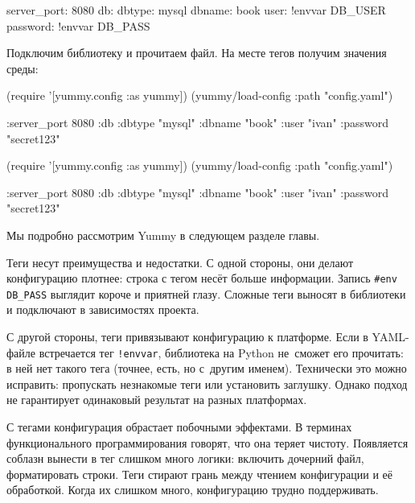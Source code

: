 \begin{english}
  \begin{yaml}
server_port: 8080
db:
  dbtype:   mysql
  dbname:   book
  user:     !envvar DB_USER
  password: !envvar DB_PASS
  \end{yaml}
\end{english}

Подключим библиотеку и прочитаем файл. На месте тегов получим значения среды:

\ifnarrow

\begin{english}
  \begin{clojure}
(require '[yummy.config :as yummy])
(yummy/load-config
  {:path "config.yaml"})

{:server_port 8080
 :db {:dbtype "mysql"
      :dbname "book"
      :user "ivan"
      :password "secret123"}}
  \end{clojure}
\end{english}

\else

\begin{english}
  \begin{clojure}
(require '[yummy.config :as yummy])
(yummy/load-config {:path "config.yaml"})

{:server_port 8080
 :db {:dbtype "mysql"
      :dbname "book"
      :user "ivan"
      :password "secret123"}}
  \end{clojure}
\end{english}
\fi


\noindent
Мы подробно рассмотрим Yummy в следующем разделе главы.

Теги несут преимущества и недостатки. С одной стороны, они делают конфигурацию
плотнее: строка с тегом несёт больше информации. Запись \verb|#env DB_PASS|
выглядит короче и приятней глазу. Сложные теги выносят в библиотеки и подключают
в зависимостях проекта.

С другой стороны, теги привязывают конфигурацию к платформе. Если в YAML-файле
встречается тег \verb|!envvar|, библиотека на Python не~сможет его прочитать: в
ней нет такого тега (точнее, есть, но с~другим именем). Технически это можно
исправить: пропускать незнакомые теги или установить заглушку. Однако подход не
гарантирует одинаковый результат на разных платформах.

С тегами конфигурация обрастает побочными эффектами. В терминах функционального
программирования говорят, что она теряет чистоту. Появляется соблазн вынести в
тег слишком много логики: включить дочерний файл, форматировать строки. Теги
стирают грань между чтением конфигурации и её обработкой. Когда их слишком
много, конфигурацию трудно поддерживать.

